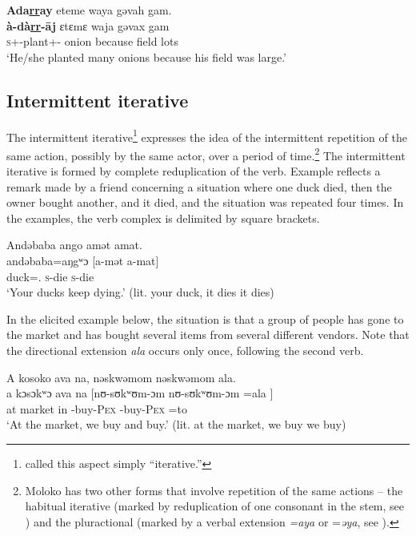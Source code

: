 \ea\label{ex:7:89}
\textbf{Ada\underline{rr}ay}  eteme  waya  gəvah  gam.\\
\gll  \textbf{à-dà\underline{rr}{}-\={a}j}    ɛtɛmɛ  waja  gəvax  gam\\
      \textsc{s}+{\PFV}-plant+{\ITR}-{\CL}  onion  because  field  lots\\
\glt  ‘He/she planted many onions because his field was large.’\\
\z
{}
\subsection{Intermittent iterative}\label{sec:7.4.5}
\hypertarget{RefHeading1212301525720847}{}
The intermittent iterative\footnote{\citet{FriesenMamalis2008} called this aspect simply “iterative.”} expresses the idea of the intermittent repetition of the same action, possibly by the same actor, over a period of time.\footnote{Moloko has two other forms that involve repetition of the same actions -- the habitual iterative (marked by reduplication of one consonant in the stem, see ) and the pluractional (marked by a verbal extension\textit{ =aya }or =\textit{əya}, see ).}  The intermittent iterative is formed by complete reduplication of the verb. Example  reflects a remark made by a friend concerning a situation where one duck died, then the owner bought another, and it died, and the situation was repeated four times.  In the examples, the verb complex is delimited by square brackets. 

\ea\label{ex:7:90} 
Andəbaba  ango  amət  amat.\\
\gll andəbaba=aŋgʷɔ [a-mət a-mat]\\
     duck={\twoS}.{\POSS}  \textsc{s}-die   \textsc{s}-die \\
\glt ‘Your ducks keep dying.’ (lit. your duck, it dies it dies)
\z

In the elicited example below, the situation is that a group of people has gone to the market and has bought several items from several different vendors. Note that the directional extension \textit{ala} occurs only once, following the second verb.

\ea\label{ex:7:91}
A  kosoko  ava  na,  nəskwəmom  nəskwəmom  ala.\\
\gll  a  kɔsɔkʷɔ  ava  na  [nʊ-sʊkʷʊm-ɔm   nʊ-sʊkʷʊm-ɔm =ala ]\\
      at  market  in  {\PSP}  {\oneS}-buy-\textsc{Pex}  {\oneS}-buy-\textsc{Pex}   =to\\
\glt  ‘At the market, we buy and buy.’ (lit. at the market, we buy we buy)\\
\z 
{}
